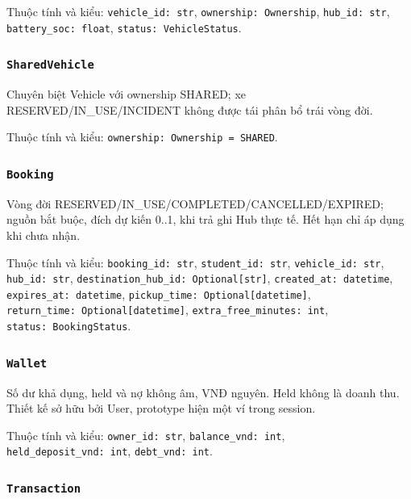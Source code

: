\documentclass[11pt,a4paper]{article}
\begin{document}
Thuộc tính và kiểu: \texttt{vehicle\_id:\ str},
\texttt{ownership:\ Ownership}, \texttt{hub\_id:\ str},
\texttt{battery\_soc:\ float}, \texttt{status:\ VehicleStatus}.

\hypertarget{sharedvehicle}{%
\subsubsection{\texorpdfstring{\texttt{SharedVehicle}}{SharedVehicle}}\label{sharedvehicle}}

Chuyên biệt Vehicle với ownership SHARED; xe RESERVED/IN\_USE/INCIDENT
không được tái phân bổ trái vòng đời.

Thuộc tính và kiểu: \texttt{ownership:\ Ownership\ =\ SHARED}.

\hypertarget{booking}{%
\subsubsection{\texorpdfstring{\texttt{Booking}}{Booking}}\label{booking}}

Vòng đời RESERVED/IN\_USE/COMPLETED/CANCELLED/EXPIRED; nguồn bắt buộc,
đích dự kiến 0..1, khi trả ghi Hub thực tế. Hết hạn chỉ áp dụng khi chưa
nhận.

Thuộc tính và kiểu: \texttt{booking\_id:\ str},
\texttt{student\_id:\ str}, \texttt{vehicle\_id:\ str},
\texttt{hub\_id:\ str},
\texttt{destination\_hub\_id:\ Optional{[}str{]}},
\texttt{created\_at:\ datetime}, \texttt{expires\_at:\ datetime},
\texttt{pickup\_time:\ Optional{[}datetime{]}},
\texttt{return\_time:\ Optional{[}datetime{]}},
\texttt{extra\_free\_minutes:\ int}, \texttt{status:\ BookingStatus}.

\hypertarget{wallet}{%
\subsubsection{\texorpdfstring{\texttt{Wallet}}{Wallet}}\label{wallet}}

Số dư khả dụng, held và nợ không âm, VNĐ nguyên. Held không là doanh
thu. Thiết kế sở hữu bởi User, prototype hiện một ví trong session.

Thuộc tính và kiểu: \texttt{owner\_id:\ str},
\texttt{balance\_vnd:\ int}, \texttt{held\_deposit\_vnd:\ int},
\texttt{debt\_vnd:\ int}.

\hypertarget{transaction}{%
\subsubsection{\texorpdfstring{\texttt{Transaction}}{Transaction}}\label{transaction}}
\end{document}
